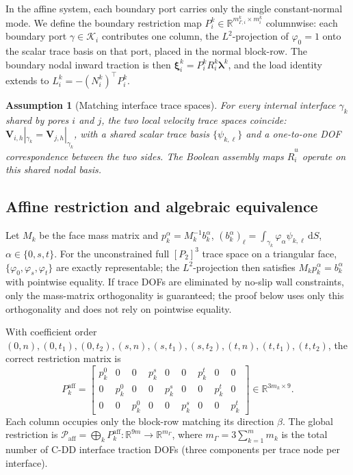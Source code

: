 \documentclass[11pt,a4paper]{article}
\newtheorem{assumption}{Assumption}[section]
\newcommand{\R}{\mathbb{R}}
\newcommand{\iface}{\gamma}
\newcommand{\trac}{\bm{\lambda}}
\begin{document}
In the affine system, each boundary port carries only the single
constant-normal mode.  We define the boundary restriction map
$P_i^k \in \R^{m_{\Gamma,i}^k \times m_i^k}$ columnwise: each
boundary port $\gamma \in \mathcal{K}_i$ contributes one column, the
$L^2$-projection of $\varphi_0 = 1$ onto the scalar trace basis on
that port, placed in the normal block-row.  The boundary nodal inward
traction is then $\bm{\xi}_i^k = P_i^k R_i^k \trac^k$, and the
load identity extends to $L_i^k = -(N_i^k)^\top P_i^k$.

\begin{assumption}[Matching interface trace spaces]\label{ass:matching-trace}
  For every internal interface $\iface_k$ shared by pores $i$ and $j$,
  the two local velocity trace spaces coincide:
  $\mathbf{V}_{i,h}|_{\iface_k} = \mathbf{V}_{j,h}|_{\iface_k}$,
  with a shared scalar trace basis $\{\psi_{k,\ell}\}$ and a one-to-one
  DOF correspondence between the two sides.  The Boolean assembly maps
  $\widehat{R}_i^u$ operate on this shared nodal basis.
\end{assumption}

\subsection{Affine restriction and algebraic equivalence}

Let $M_k$ be the face mass matrix and
$p_k^\alpha = M_k^{-1} b_k^\alpha$,
$(b_k^\alpha)_\ell = \int_{\iface_k} \varphi_\alpha \psi_{k,\ell}\,\mathrm{d}S$,
$\alpha \in \{0,s,t\}$.
For the unconstrained full $[P_2]^3$ trace space on a triangular face,
$\{\varphi_0,\varphi_s,\varphi_t\}$ are exactly representable; the $L^2$-projection
then satisfies $M_k p_k^\alpha = b_k^\alpha$ with pointwise equality.
If trace DOFs are eliminated by no-slip wall constraints, only the
mass-matrix orthogonality is guaranteed; the proof below uses only this
orthogonality and does not rely on pointwise equality.

With coefficient order
$(0,n),(0,t_1),(0,t_2),(s,n),(s,t_1),(s,t_2),(t,n),(t,t_1),(t,t_2)$,
the correct restriction matrix is
\begin{equation}\label{eq:Paff}
  P_k^{\text{aff}} =
  \begin{bmatrix}
    p_k^0&0&0&p_k^s&0&0&p_k^t&0&0\\
    0&p_k^0&0&0&p_k^s&0&0&p_k^t&0\\
    0&0&p_k^0&0&0&p_k^s&0&0&p_k^t
  \end{bmatrix}
  \in \R^{3m_k \times 9}.
\end{equation}
Each column occupies only the block-row matching its direction $\beta$.
The global restriction is
$\mathcal{P}_{\text{aff}} = \bigoplus_k P_k^{\text{aff}}
 : \R^{9m} \to \R^{m_\Gamma}$,
where $m_\Gamma = 3\sum_{k=1}^m m_k$ is the total number of C-DD
interface traction DOFs (three components per trace node per interface).
\end{document}
